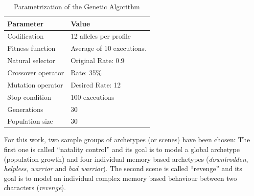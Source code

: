\documentclass[runningheads]{llncs}
\begin{document}
\begin{table}
\begin{center}
\caption{Parametrization of the Genetic Algorithm}
\label{fig:ga_parameters}
\begin{tabular}{p{3cm}p{7cm}}
\hline\noalign{\smallskip}
\noalign{\smallskip}
Parameter & Value \\
\hline
\noalign{\smallskip}
Codification & 12 alleles per profile\\
Fitness function & Average of 10 executions.\\
Natural selector & Original Rate: 0.9 \\
Crossover operator & Rate: 35\% \\
Mutation operator & Desired Rate: 12 \\
Stop condition & 100 executions\\
Generations & 30\\
Population size & 30 \\
\hline
\end{tabular}


\end{center}
\end{table}



For this work, two sample groups of archetypes (or scenes)  have been chosen: The first one is called ``natality control'' and its goal is to model a global archetype (population growth) and four individual memory based archetypes (\textit{downtrodden}, \textit{helpless}, \textit{warrior} and \textit{bad warrior}). The second scene is called ``revenge'' and its goal is to model an individual complex memory based behaviour between two characters (\textit{revenge}).
\end{document}
